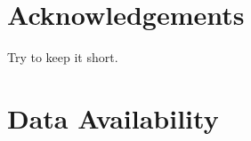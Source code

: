 \documentclass[letters, usenatbib]{mnras}
\begin{document}
\section*{Acknowledgements}

Try to keep it short.

\section*{Data Availability}











\bsp	%
\label{lastpage}
\end{document}
